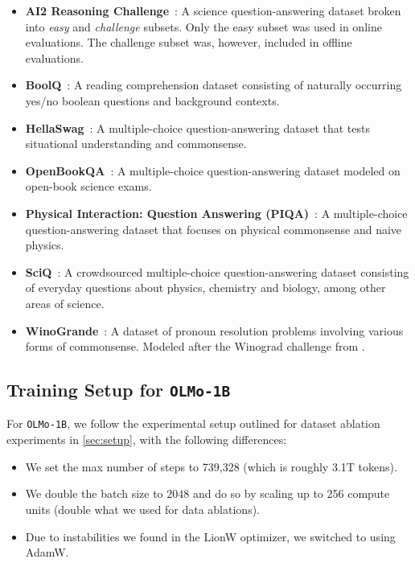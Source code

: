 \documentclass{article}
\newcommand{\OlmoTiny}{\texttt{OLMo-1B}\xspace}
\begin{document}
\begin{itemize}[leftmargin=1em]
    \item \textbf{AI2 Reasoning Challenge}~\citep{arc}: A science question-answering dataset broken into \emph{easy} and \emph{challenge} subsets. Only the easy subset was used in online evaluations. The challenge subset was, however,  included in offline evaluations.
    \item \textbf{BoolQ}~\citep{clark2019boolq}: A reading comprehension dataset consisting of naturally occurring yes/no boolean questions and background contexts. 
    \item \textbf{HellaSwag}~\citep{zellers2019hellaswag}: A multiple-choice question-answering dataset that tests situational understanding and commonsense. 
    \item \textbf{OpenBookQA}~\citep{openbookQA}: A multiple-choice question-answering dataset modeled on open-book science exams.  
    \item \textbf{Physical Interaction: Question Answering (PIQA)}~\citep{piqa}: A multiple-choice question-answering dataset that focuses on physical commonsense and naive physics.  
    \item \textbf{SciQ}~\citep{sciq}: A crowdsourced multiple-choice question-answering dataset consisting of everyday questions about physics, chemistry and biology, among other areas of science.   
    \item \textbf{WinoGrande}~\citep{winogrande}: A dataset of pronoun resolution problems involving various forms of commonsense. Modeled after the Winograd challenge from \citet{wsc}.  
\end{itemize}

\subsection{Training Setup for \OlmoTiny}
\label{appendix:training-olmo-1b}

For \OlmoTiny, we follow the experimental setup outlined for dataset ablation experiments in \autoref{sec:setup}, with the following differences:

\begin{itemize}[leftmargin=1em]
    \item We set the max number of steps to 739,328 (which is roughly 3.1T tokens).
    \item We double the batch size to $2048$ and do so by scaling up to 256 compute units (double what we used for data ablations).
    \item Due to instabilities we found in the LionW optimizer, we switched to using AdamW.
\end{itemize}
\end{document}

